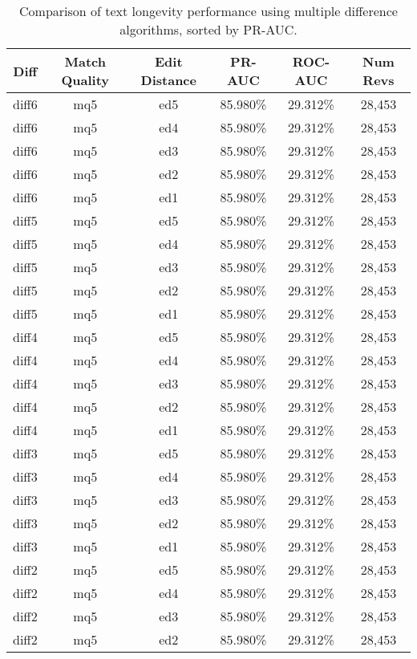 \begin{table}[tbph]
\begin{center}
\begin{tabular}{|c|c|c||c|c|c|}
\hline
Diff & Match Quality & Edit Distance & PR-AUC & ROC-AUC & Num Revs \\
\hline
\hline
diff6 & mq5 & ed5 & 85.980\% & 29.312\% & 28,453 \\
diff6 & mq5 & ed4 & 85.980\% & 29.312\% & 28,453 \\
diff6 & mq5 & ed3 & 85.980\% & 29.312\% & 28,453 \\
diff6 & mq5 & ed2 & 85.980\% & 29.312\% & 28,453 \\
diff6 & mq5 & ed1 & 85.980\% & 29.312\% & 28,453 \\
diff5 & mq5 & ed5 & 85.980\% & 29.312\% & 28,453 \\
diff5 & mq5 & ed4 & 85.980\% & 29.312\% & 28,453 \\
diff5 & mq5 & ed3 & 85.980\% & 29.312\% & 28,453 \\
diff5 & mq5 & ed2 & 85.980\% & 29.312\% & 28,453 \\
diff5 & mq5 & ed1 & 85.980\% & 29.312\% & 28,453 \\
diff4 & mq5 & ed5 & 85.980\% & 29.312\% & 28,453 \\
diff4 & mq5 & ed4 & 85.980\% & 29.312\% & 28,453 \\
diff4 & mq5 & ed3 & 85.980\% & 29.312\% & 28,453 \\
diff4 & mq5 & ed2 & 85.980\% & 29.312\% & 28,453 \\
diff4 & mq5 & ed1 & 85.980\% & 29.312\% & 28,453 \\
diff3 & mq5 & ed5 & 85.980\% & 29.312\% & 28,453 \\
diff3 & mq5 & ed4 & 85.980\% & 29.312\% & 28,453 \\
diff3 & mq5 & ed3 & 85.980\% & 29.312\% & 28,453 \\
diff3 & mq5 & ed2 & 85.980\% & 29.312\% & 28,453 \\
diff3 & mq5 & ed1 & 85.980\% & 29.312\% & 28,453 \\
diff2 & mq5 & ed5 & 85.980\% & 29.312\% & 28,453 \\
diff2 & mq5 & ed4 & 85.980\% & 29.312\% & 28,453 \\
diff2 & mq5 & ed3 & 85.980\% & 29.312\% & 28,453 \\
diff2 & mq5 & ed2 & 85.980\% & 29.312\% & 28,453 \\
\hline
\end{tabular}
\end{center}
\caption{Comparison of text longevity performance using
    multiple difference algorithms, sorted by PR-AUC.}
\label{tab:textshoutA}
\end{table}
